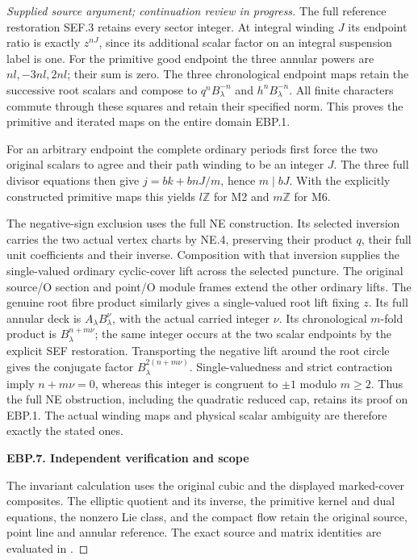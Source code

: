 \begin{proof}[Supplied source argument; continuation review in progress]
The full reference restoration SEF.3 retains every sector integer.
At integral winding \(J\) its endpoint ratio is exactly
\(z^{nJ}\), since its additional scalar factor on an integral
suspension label is one. For the primitive good endpoint the three
annular powers are \(nl,-3nl,2nl\); their sum is zero. The three
chronological endpoint maps retain the successive root scalars and
compose to \(q^nB_\lambda^{-n}\) and \(h^nB_\lambda^{-n}\).
All finite characters commute through these squares and retain their
specified norm. This proves the primitive and iterated maps on the
entire domain EBP.1.

For an arbitrary endpoint the complete ordinary periods first force
the two original scalars to agree and their path winding to be an
integer \(J\). The three full divisor equations then give
\(j=bk+bnJ/m\), hence \(m\mid bJ\). With the explicitly
constructed primitive maps this yields \(l\mathbb Z\) for M2
and \(m\mathbb Z\) for M6.

The negative-sign exclusion uses the full NE construction. Its selected
inversion carries the two actual vertex charts by NE.4, preserving
their product \(q\), their full unit coefficients and their inverse.
Composition with that inversion supplies the single-valued ordinary
cyclic-cover lift across the selected puncture. The original source/O
section and point/O module frames extend the other ordinary lifts.
The genuine root fibre product similarly gives a single-valued root
lift fixing \(z\). Its full annular deck is
\(A_\lambda B_\lambda^\nu\), with the actual carried integer
\(\nu\). Its chronological \(m\)-fold product is
\(B_\lambda^{n+m\nu}\); the same integer occurs at the two
scalar endpoints by the explicit SEF restoration.
Transporting the negative lift around the root circle gives the
conjugate factor \(B_\lambda^{2(n+m\nu)}\). Single-valuedness
and strict contraction imply \(n+m\nu=0\), whereas this integer
is congruent to \(\pm1\) modulo \(m\ge2\). Thus the full NE
obstruction, including the quadratic reduced cap, retains its proof
on EBP.1. The actual winding maps and physical scalar ambiguity are
therefore exactly the stated ones.

\par

\medskip\noindent\textbf{EBP.7. Independent verification and scope}

\par\nobreak

The invariant calculation uses the original cubic and the displayed
marked-cover composites. The elliptic quotient and its inverse, the
primitive kernel and dual equations, the nonzero Lie class, and the
compact flow retain the original source, point line and annular reference.
The exact source and matrix identities are evaluated in .


\end{proof}
